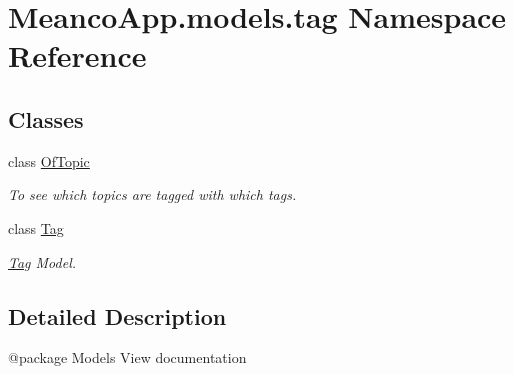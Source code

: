 \hypertarget{namespace_meanco_app_1_1models_1_1tag}{}\section{Meanco\+App.\+models.\+tag Namespace Reference}
\label{namespace_meanco_app_1_1models_1_1tag}
\subsection*{Classes}
\begin{DoxyCompactItemize}
\item 
class \hyperlink{class_meanco_app_1_1models_1_1tag_1_1_of_topic}{Of\+Topic}
\begin{DoxyCompactList}\small\item\em To see which topics are tagged with which tags. \end{DoxyCompactList}\item 
class \hyperlink{class_meanco_app_1_1models_1_1tag_1_1_tag}{Tag}
\begin{DoxyCompactList}\small\item\em \hyperlink{class_meanco_app_1_1models_1_1tag_1_1_tag}{Tag} Model. \end{DoxyCompactList}\end{DoxyCompactItemize}


\subsection{Detailed Description}
\begin{DoxyVerb}@package Models
View documentation\end{DoxyVerb}
 